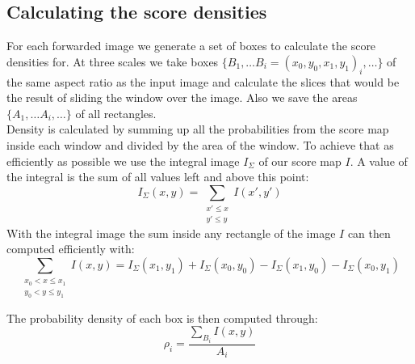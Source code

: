 \subsection{Calculating the score densities}
\label{sec:pipeline:eval:density}
For each forwarded image we generate a set of boxes to calculate the score densities for. At three scales we take boxes $\{B_1,\dots B_i = (x_0, y_0, x_1, y_1)_i,\dots\}$ of the same aspect ratio as the input image and calculate the slices that would be the result of sliding the window over the image. Also we save the areas $\{A_1,\dots A_i,\dots\}$ of all rectangles.\\
Density is calculated by summing up all the probabilities from the score map inside each window and divided by the area of the window. To achieve that as efficiently as possible we use the integral image $I_\Sigma$ of our score map $I$. A value of the integral is the sum of all values left and above this point:
\begin{equation}
    I_\Sigma(x, y) = \sum_{\substack{x' \le x\\ y' \le y}} I(x', y')
\end{equation}
With the integral image the sum inside any rectangle of the image $I$ can then computed efficiently with:
\begin{equation}
    \sum_{\substack{x_0 < x \le x_1\\ y_0 < y \le y_1}}I(x,y) = I_\Sigma(x_1, y_1) + I_\Sigma(x_0, y_0) - I_\Sigma(x_1, y_0) - I_\Sigma(x_0, y_1)
\end{equation}

The probability density of each box is then computed through:
\begin{equation}
    \rho_i = \frac{\sum_{B_i}I(x,y)}{A_i}
\end{equation}

